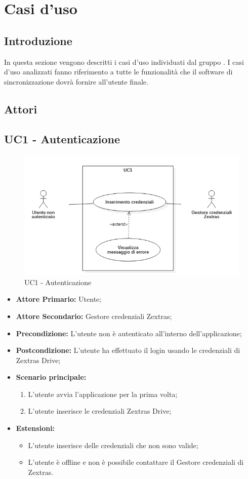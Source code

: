\section{Casi d'uso}
\subsection{Introduzione}
In questa sezione vengono descritti i casi d'uso individuati dal gruppo \gruppo{}.
I casi d'uso analizzati fanno riferimento a tutte le funzionalità che il software di sincronizzazione dovrà fornire all'utente finale.

\subsection{Attori}


\subsection{UC1 - Autenticazione}
\begin{figure}[H]
    \centering
    \includegraphics[scale = 0.7]{components/img/UC1.png}
    \caption{UC1 - Autenticazione}
\end{figure}
\begin{itemize}
\item \textbf{Attore Primario:} Utente;
\item \textbf{Attore Secondario:} Gestore credenziali Zextras;
\item \textbf{Precondizione:} L'utente non è autenticato all'interno dell'applicazione;
\item \textbf{Postcondizione:} L'utente ha effettuato il login usando le credenziali di Zextras Drive;
\item \textbf{Scenario principale:}
    \begin{enumerate}
    \item L'utente avvia l'applicazione per la prima volta;
    \item L'utente inserisce le credenziali Zextras Drive;
    \end{enumerate}
\item \textbf{Estensioni:}
\begin{itemize}
\item L'utente inserisce delle credenziali che non sono valide;
\item L'utente è offline e non è possibile contattare il Gestore credenziali di Zextras.
\end{itemize}
\end{itemize}